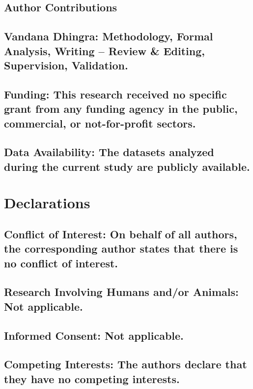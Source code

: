 \documentclass[iicol,sn-mathphys-num]{sn-jnl}%
\theoremstyle{thmstyleone}%
\theoremstyle{thmstyletwo}%
\theoremstyle{thmstylethree}%
\begin{document}
\subsection*{\small Author Contributions \\
{\\
{\small Vandana Dhingra: Methodology, Formal Analysis, Writing – Review \& Editing, Supervision, Validation.}}}
\subsection*{\small Funding: {\normalfont This research received no specific grant from any funding agency in the public, commercial, or not-for-profit sectors.}}
\subsection*{\small Data Availability: {\normalfont The datasets analyzed during the current study are publicly available.}}


\vspace{0.2cm}
\section*{\normalsize Declarations}

\subsection*{\small Conflict of Interest: {\normalfont On behalf of all authors, the corresponding author states that there is no conflict of interest.}}
\subsection*{\small Research Involving Humans and/or Animals: {\normalfont Not applicable.}}
\subsection*{\small Informed Consent: {\normalfont Not applicable.}}
\subsection*{\small Competing Interests: {\normalfont The authors declare that they have no competing interests.}}


\vspace{0.2cm}
\end{document}
